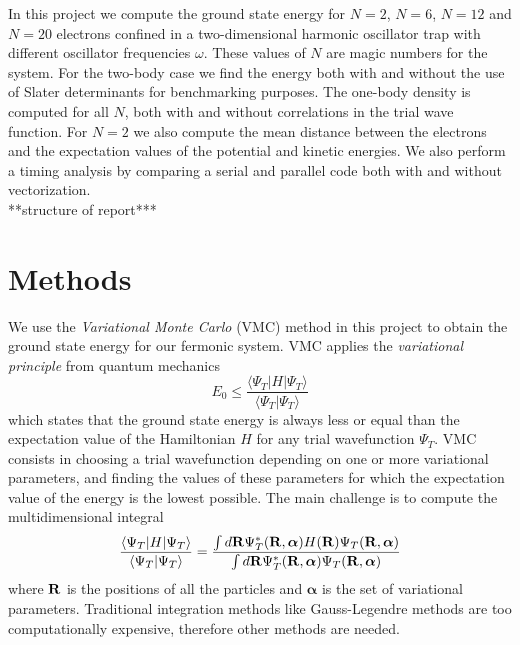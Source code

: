\documentclass[english, a4paper]{article}
\begin{document}
\noindent In this project we compute the ground state energy for
$N=2$, $N=6$, $N=12$ and $N=20$ electrons
confined in a two-dimensional harmonic oscillator trap with different oscillator frequencies $\omega$.
These values of $N$ are magic numbers for the system.
For the two-body case we find the energy both with and without the use of Slater determinants for 
benchmarking purposes. The one-body density is computed for all $N$, both with and without correlations
in the trial wave function. 
For $N=2$ we also compute the mean distance between the electrons and the expectation values of the potential
and kinetic energies. We also perform a timing analysis by comparing a serial and parallel code both with 
and without vectorization.\\

\noindent ***structure of report***



\section{Methods}

We use the \textit{Variational Monte Carlo} (VMC) method in this project to obtain the ground state energy
for our fermonic system. VMC applies the \textit{variational principle} from quantum mechanics
\begin{equation}
 E_0 \leq \frac{\langle \Psi_T | H | \Psi_T \rangle}{\langle \Psi_T | \Psi_T \rangle}
\end{equation}
which states that the ground state energy is always less or equal than the expectation value of the Hamiltonian $H$
for any trial wavefunction $\Psi_T$. VMC consists in choosing a trial wavefunction depending on one or more
variational parameters, and finding the values of these parameters for which the expectation value of the 
energy is the lowest possible. The main challenge is to compute the multidimensional integral
\begin{equation}
 \frac{\langle \Psi_T | H | \Psi_T \rangle}{\langle \Psi_T | \Psi_T \rangle} = 
 \frac{\int d {\bf R} \Psi_T^*({\bf R}, \boldsymbol{\alpha}) H({\bf R}) \Psi_T({\bf R}, \boldsymbol{\alpha})}
       {\int d {\bf R} \Psi_T^*({\bf R}, \boldsymbol{\alpha}) \Psi_T({\bf R}, \boldsymbol{\alpha})}
 \label{multidim}
\end{equation}
where $\bf{R}$ is the positions of all the particles and $\boldsymbol{\alpha}$ is the set of variational parameters.
Traditional integration methods like Gauss-Legendre methods are too computationally expensive, therefore 
other methods are needed.
\end{document}
